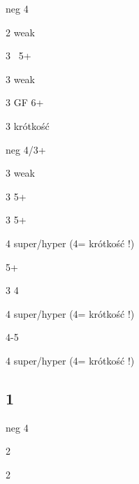 \documentclass[12pt, a4paper]{article}
\begin{document}
\compsequence{{1\diams}{2\spades}}
\begin{compoptions}[3]
  \item[\dbl] neg 4
  \item[2\nt] weak \clubs \orr \gf\ \clubs \orr \inv \diams
  \item[3\clubs] \invp\ 5+\hearts
  \item[3\diams] weak 
  \item[3\hearts] GF 6+ 
  \item[3\spades] krótkość 
\end{compoptions}


\compsequence{{1\diams}{3\clubs}}
\begin{compoptions}[3]
  \item[\dbl] neg 4/3+\major
  \item[3\diams] weak
  \item[3\hearts] 5+\spades\ \invp
  \item[3\spades] 5+\hearts\ \gf
  \item[4\minor] super/hyper (4\diams = krótkość \clubs!)    
\end{compoptions}  


\compsequence{{1\diams}{3\hearts}}
\begin{compoptions}[3]
  \item[\dbl] 5+\spades\ \invp
  \item[3\spades] 4\spades    
  \item[4\minor] super/hyper (4\diams = krótkość \hearts!)   
\end{compoptions}  


\compsequence{{1\diams}{3\spades}}
\begin{compoptions}[3]
  \item[\dbl] 4-5\hearts  
  \item[4\minor] super/hyper (4\diams = krótkość \spades!)   
\end{compoptions}  






\subsection*{1\major}


\compsequence{{1\hearts}{2\clubs}}
\begin{compoptions}[3]
  \item[\dbl] neg 4
  \item[2\diams] \nf 
  \item[2\spades] \fonce 
\end{compoptions}
\end{document}
